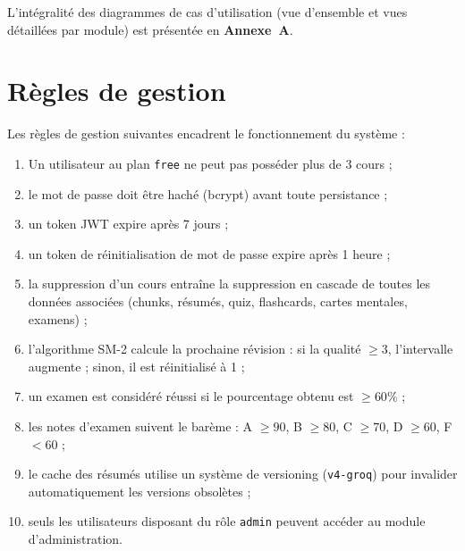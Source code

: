 L'intégralité des diagrammes de cas d'utilisation (vue d'ensemble et vues détaillées par module) est présentée en \textbf{Annexe~A}.

\section{Règles de gestion}

Les règles de gestion suivantes encadrent le fonctionnement du système :

\begin{enumerate}[label=\textbf{RG\arabic*.}]
  \item Un utilisateur au plan \texttt{free} ne peut pas posséder plus de 3 cours ;
  \item le mot de passe doit être haché (bcrypt) avant toute persistance ;
  \item un token JWT expire après 7 jours ;
  \item un token de réinitialisation de mot de passe expire après 1 heure ;
  \item la suppression d'un cours entraîne la suppression en cascade de toutes les données associées (chunks, résumés, quiz, flashcards, cartes mentales, examens) ;
  \item l'algorithme SM-2 calcule la prochaine révision : si la qualité $\geq 3$, l'intervalle augmente ; sinon, il est réinitialisé à 1 ;
  \item un examen est considéré réussi si le pourcentage obtenu est $\geq 60\%$ ;
  \item les notes d'examen suivent le barème : A $\geq 90$, B $\geq 80$, C $\geq 70$, D $\geq 60$, F $< 60$ ;
  \item le cache des résumés utilise un système de versioning (\texttt{v4-groq}) pour invalider automatiquement les versions obsolètes ;
  \item seuls les utilisateurs disposant du rôle \texttt{admin} peuvent accéder au module d'administration.
\end{enumerate}
